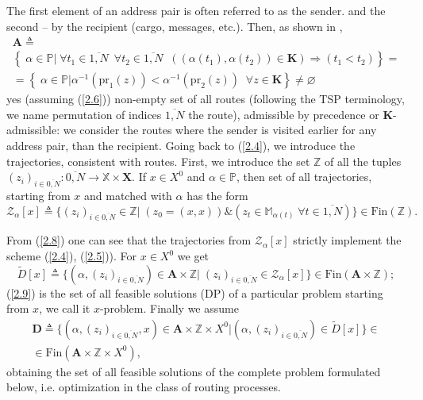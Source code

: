 \documentclass[numbers,sort&compress]{IntechOpen-Book}%
\begin{document}
The first element of an address pair
is often referred to as the sender.
and the second -- by the recipient
(cargo, messages, etc.).
Then, as shown in \cite[part 2]{14},
\begin{multline}\label{2.7}
    \mathbf{A} {\triangleq} \\
    \left\{\;\alpha \in \mathbb{P} \vert\;
      \forall{t_1} \in \overline{1,N}\;\
      \forall{t_2}  \in \overline{1,N}\;\;
      ((\alpha(t_1),\alpha(t_2)) \in \mathbf{K})
      \Longrightarrow (t_1 < t_2)
    \right\} = \\
    =
    \left\{\;
      \alpha \in \mathbb{P} \vert
      \alpha^{-1}(\mathrm{pr}_1(z)) < \alpha^{-1}(\mathrm{pr}_2(z))\;\;\forall{z}
      \in \mathbf{K}
    \right\} \ne \varnothing
\end{multline}
yes
(assuming  (\ref{2.6}))
non-empty set of all routes
(following the TSP terminology,
we name permutation of indices $\overline {1, N}$
the route),
admissible by precedence or $\mathbf {K}$-admissible:
we consider the routes
where the sender is visited earlier for any address pair,
than the recipient.
Going back to  (\ref{2.4}),
we introduce the trajectories,
consistent with routes.
First, we introduce the set
$\mathbb{Z}$
of all the tuples
$(z_i)_{i \in \overline{0,N}}: \overline{0,N} \longrightarrow \mathbb{X} \times \mathbf{X}$.
If $x \in X^0$ and $\alpha \in \mathbb{P}$,
then
set of all trajectories,
starting from $ x $
and matched with $\alpha $
has the form
\begin{equation}\label{2.8}
\mathcal{Z}_\alpha[x] {\triangleq} \{(z_i)_{i \in \overline{0,N}}
\in \mathbb{Z} \vert\;(z_0 = (x,x)) \& (z_t \in \mathbb{M}_{\alpha(t)}\;\forall{t} \in \overline{1,N})\} \in \mathrm{Fin}(\mathbb{Z}).
\end{equation}

From  (\ref{2.8})
one can see
that the trajectories from
$ \mathcal {Z}_\alpha[x] $
strictly implement the scheme
 (\ref{2.4}),  (\ref{2.5})).
For $x \in X^0$
we get
\begin{equation}\label{2.9}
  \tilde{D}[x] {\triangleq}
  \{(\alpha,(z_i)_{i \in \overline{0,N}}) \in \mathbf{A} \times \mathbb{Z}
  \vert \;(z_i)_{i \in \overline{0,N}} \in \mathcal{Z}_\alpha[x]\}
  \in \mathrm{Fin}(\mathbf{A} \times \mathbb{Z});
\end{equation}
 (\ref{2.9})
is the set of all feasible solutions
(DP)
of a particular problem starting from $x$,
we call it $x$-problem.
Finally we assume
\begin{multline}\label{2.10}
  \mathbf{D} {\triangleq}
  \{(\alpha,(z_i)_{i \in \overline{0,N}},x) \in \mathbf{A} \times \mathbb{Z} \times X^0 \vert
  (\alpha,(z_i)_{i \in \overline{0,N}}) \in \tilde{D}[x]\}
  \in
  \\
  \in \mathrm{Fin}(\mathbf{A} \times \mathbb{Z} \times X^0),
\end{multline}
obtaining the set of all
feasible solutions of the complete problem formulated below,
i.e. optimization in the class of routing processes.
\end{document}
